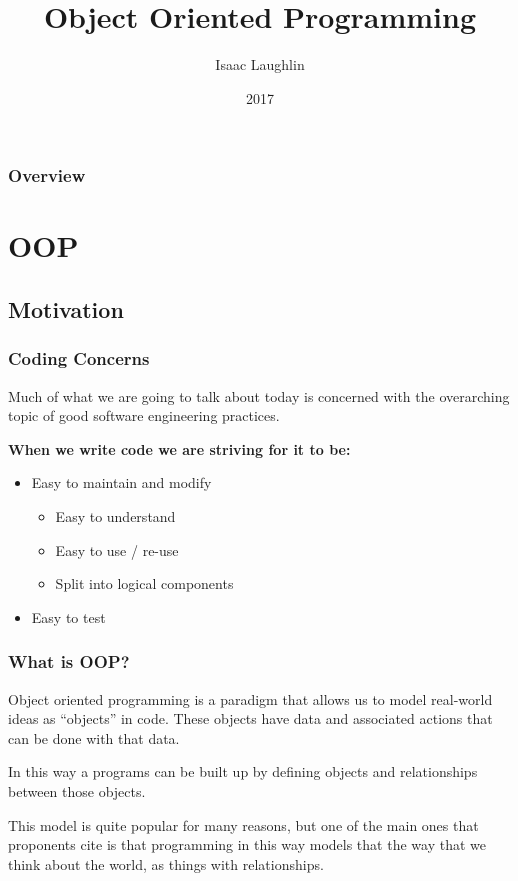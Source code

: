 \documentclass{beamer}
\title{Object Oriented Programming}
\author{Isaac Laughlin}
\institute{Galvanize}
\date{2017}
\begin{document}
\frame{\titlepage}

\begin{frame}
  \frametitle{Overview}
  \tableofcontents[]
\end{frame}

\section{OOP}
\subsection{Motivation}
\begin{frame}
  \frametitle{Coding Concerns}
  Much of what we are going to talk about today is concerned with the overarching topic of good software engineering practices. \vspace{4mm}

  \textbf{When we write code we are striving for it to be:}

  \vspace{4mm}
  \begin{itemize}
    \item Easy to maintain and modify
    \begin{itemize}
      \item Easy to understand
      \item Easy to use / re-use
      \item Split into logical components
    \end{itemize}
    \item Easy to test
  \end{itemize}
\end{frame}

\begin{frame}
  \frametitle{What is OOP?}
  Object oriented programming is a paradigm that allows us to model real-world ideas as ``objects'' in code. These objects have data and associated actions that can be done with that data. \vspace{4mm}
  \pause

  In this way a programs can be built up by defining objects and relationships between those objects. \vspace{4mm}
  \pause

    This model is quite popular for many reasons, but one of the main ones that proponents cite is that programming in this way models that the way that we think about the world, as things with relationships.
\end{frame}
\end{document}
